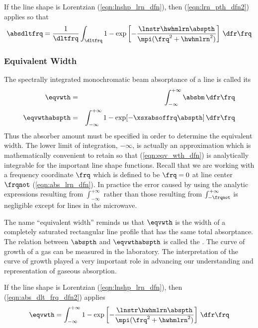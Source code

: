 \documentclass[12pt]{article}
\begin{document}
If the line shape is Lorentzian (\ref{eqn:lnshp_lrn_dfn}), then
(\ref{eqn:lrn_pth_dfn2}) applies so that
\begin{equation}
\absdltfrq = \frac{1}{\dltfrq} \int_{\dltfrq} 1 - 
\exp \left[ 
-\frac{\lnstr \hwhmlrn \abspth}{\mpi(\frq^{2} + \hwhmlrn^{2})} 
\right]
\,\dfr\frq
\label{eqn:abs_dlt_frq_dfn2}
\end{equation}

\subsubsection[Equivalent Width]{Equivalent Width}\label{sxn:eqv_wdt}
The spectrally integrated monochromatic beam absorptance of a line is
called its 
\begin{eqnarray}
\eqvwth & = & \int_{-\infty}^{+\infty} \absbm \,\dfr\frq \nonumber \\
\eqvwthabspth & = & \int_{-\infty}^{+\infty} 1 - \exp[-\xsxabsoffrq \abspth] \,\dfr\frq
\label{eqn:eqv_wth_dfn}
\end{eqnarray}
Thus the absorber amount must be specified in order to determine
the equivalent width.
The lower limit of integration, $-\infty$, is actually an
approximation which is mathematically convenient to retain
so that (\ref{eqn:eqv_wth_dfn}) is analytically integrable for the
important line shape functions.
Recall that we are working with a frequency coordinate $\frq$ which is
defined to be $\frq = 0$ at line center $\frqnot$ (\ref{eqn:abs_lrn_dfn}).
In practice the error caused by using the analytic expressions
resulting from $\int_{-\infty}^{+\infty}$ rather than those resulting
from $\int_{-\frqnot}^{+\infty}$ is negligible except for lines 
in the microwave. 

The name ``equivalent width'' reminds us that $\eqvwth$ is the width 
of a completely saturated rectangular line profile that has the same
total absorptance.
The relation between $\abspth$ and $\eqvwthabspth$ is called the
.
The curve of growth of a gas can be measured in the laboratory.
The interpretation of the curve of growth played a very important role
in advancing our understanding and representation of gaseous
absorption. 

If the line shape is Lorentzian (\ref{eqn:lnshp_lrn_dfn}), then
(\ref{eqn:abs_dlt_frq_dfn2}) applies
\begin{equation}
\eqvwth = \int_{-\infty}^{+\infty} 
1 - \exp \left[ 
-\frac{\lnstr \hwhmlrn \abspth}{\mpi(\frq^{2} + \hwhmlrn^{2})} 
\right]
\,\dfr\frq
\label{eqn:eqv_wth_dfn2}
\end{equation}
\end{document}
